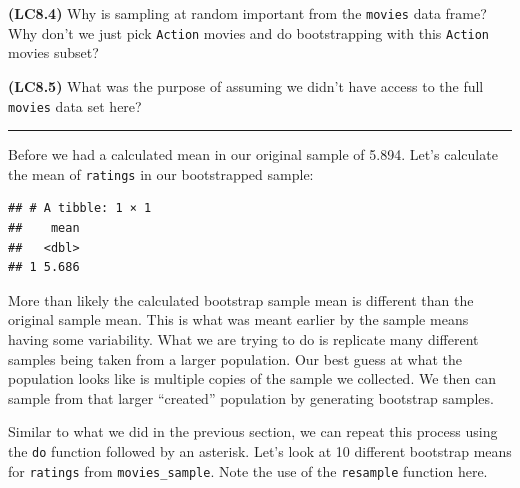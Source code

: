 \documentclass[]{tufte-book}
\newenvironment{Shaded}{\begin{snugshade}}{\end{snugshade}}
\newcommand{\KeywordTok}[1]{\textcolor[rgb]{0.13,0.29,0.53}{\textbf{{#1}}}}
\newcommand{\DataTypeTok}[1]{\textcolor[rgb]{0.13,0.29,0.53}{{#1}}}
\newcommand{\DecValTok}[1]{\textcolor[rgb]{0.00,0.00,0.81}{{#1}}}
\newcommand{\StringTok}[1]{\textcolor[rgb]{0.31,0.60,0.02}{{#1}}}
\newcommand{\NormalTok}[1]{{#1}}
\let\oldrule=\rule
\renewcommand{\rule}[1]{\oldrule{\linewidth}}
\begin{document}
\textbf{(LC8.4)} Why is sampling at random important from the
\texttt{movies} data frame? Why don't we just pick \texttt{Action}
movies and do bootstrapping with this \texttt{Action} movies subset?

\textbf{(LC8.5)} What was the purpose of assuming we didn't have access
to the full \texttt{movies} data set here?

\begin{center}\rule{0.5\linewidth}{\linethickness}\end{center}

Before we had a calculated mean in our original sample of 5.894. Let's
calculate the mean of \texttt{ratings} in our bootstrapped sample:

\begin{Shaded}
\end{Shaded}

\begin{verbatim}
## # A tibble: 1 × 1
##    mean
##   <dbl>
## 1 5.686
\end{verbatim}

More than likely the calculated bootstrap sample mean is different than
the original sample mean. This is what was meant earlier by the sample
means having some variability. What we are trying to do is replicate
many different samples being taken from a larger population. Our best
guess at what the population looks like is multiple copies of the sample
we collected. We then can sample from that larger ``created'' population
by generating bootstrap samples.

Similar to what we did in the previous section, we can repeat this
process using the \texttt{do} function followed by an asterisk. Let's
look at 10 different bootstrap means for \texttt{ratings} from
\texttt{movies\_sample}. Note the use of the \texttt{resample} function
here.

\begin{Shaded}
\end{Shaded}
\end{document}
